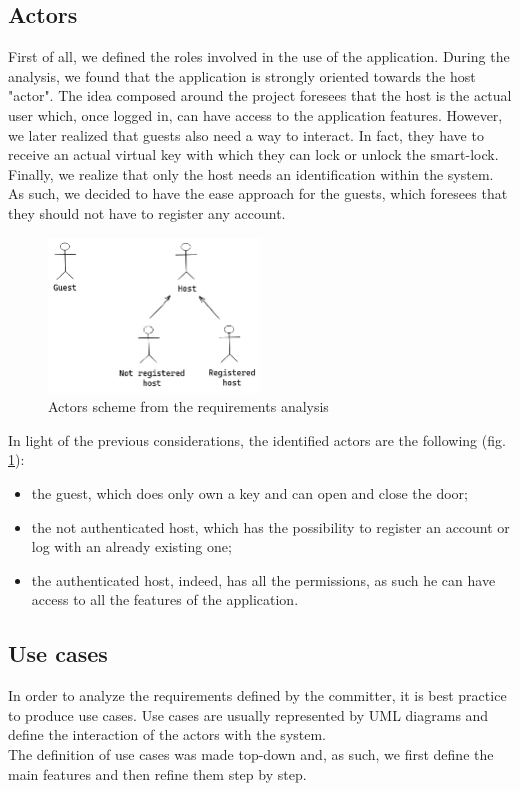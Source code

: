 \subsection{Actors}
\label{sec:actors}
First of all, we defined the roles involved in the use of the application. During the analysis, we found that the application is strongly oriented towards the host "actor". The idea composed around the project foresees that the host is the actual user which, once logged in, can have access to the application features. 
However, we later realized that guests also need a way to interact. In fact, they have to receive an actual virtual key with which they can lock or unlock the smart-lock.
\\ Finally, we realize that only the host needs an identification within the system. As such, we decided to have the ease approach for the guests, which foresees that they should not have to register any account. 
\begin{figure}[H]
    \centering
    \includegraphics[width=0.5\textwidth]{figures/actors.excalidraw.png}
    \caption{Actors scheme from the requirements analysis}
    \label{fig:requirementactors}
\end{figure}
In light of the previous considerations, the identified actors are the following (fig. \ref{fig:requirementactors}):
\begin{itemize}
    \item the guest, which does only own a key and can open and close the door;
    \item the not authenticated host, which has the possibility to register an account or log with an already existing one;
    \item the authenticated host, indeed, has all the permissions, as such he can have access to all the features of the application.
\end{itemize}

\subsection{Use cases}
In order to analyze the requirements defined by the committer, it is best practice to produce use cases. Use cases are usually represented by UML diagrams and define the interaction of the actors with the system.
\\ The definition of use cases was made top-down and, as such, we first define the main features and then refine them step by step.
